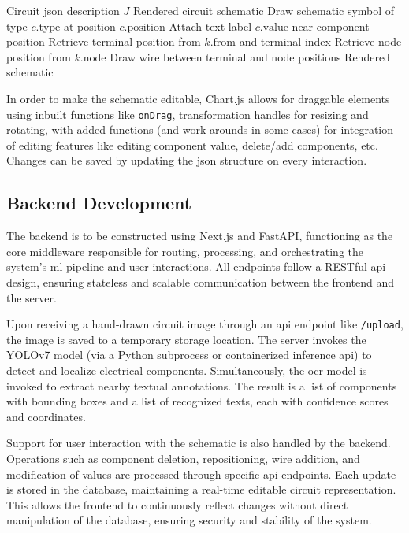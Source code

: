 \begin{algorithm}
\caption{Frontend Circuit Rendering}
\label{algo:frontend-rendering}
\begin{algorithmic}
\Require Circuit \gls{json} description $J$
\Ensure Rendered circuit schematic
    \State Draw schematic symbol of type $c.\text{type}$ at position $c.\text{position}$
    \State Attach text label $c.\text{value}$ near component position
\EndFor
{}
    \State Retrieve terminal position from $k.\text{from}$ and terminal index
    \State Retrieve node position from $k.\text{node}$
    \State Draw wire between terminal and node positions
\EndFor
\State \Return Rendered schematic
\end{algorithmic}
\end{algorithm}

In order to make the schematic editable, Chart.js allows for draggable elements using inbuilt functions like \texttt{onDrag}, transformation handles for resizing and rotating, with added functions (and work-arounds in some cases) for integration of editing features like editing component value, delete/add components, etc. Changes can be saved by updating the \gls{json} structure on every interaction.

\subsection{Backend Development}

The backend is to be constructed using Next.js and FastAPI, functioning as the core middleware responsible for routing, processing, and orchestrating the system's \gls{ml} pipeline and user interactions. All endpoints follow a RESTful \gls{api} design, ensuring stateless and scalable communication between the frontend and the server.

Upon receiving a hand-drawn circuit image through an \gls{api} endpoint like \texttt{/upload}, the image is saved to a temporary storage location. The server invokes the YOLOv7 model (via a Python subprocess or containerized inference \gls{api}) to detect and localize electrical components. Simultaneously, the \gls{ocr} model is invoked to extract nearby textual annotations. The result is a list of components with bounding boxes and a list of recognized texts, each with confidence scores and coordinates.

Support for user interaction with the schematic is also handled by the backend. Operations such as component deletion, repositioning, wire addition, and modification of values are processed through specific \gls{api} endpoints. Each update is stored in the database, maintaining a real-time editable circuit representation. This allows the frontend to continuously reflect changes without direct manipulation of the database, ensuring security and stability of the system.

